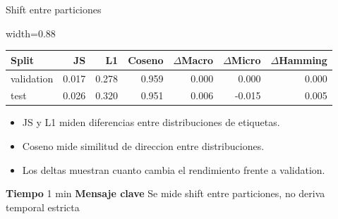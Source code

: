 \documentclass[aspectratio=169,10pt]{beamer}
\newcommand{\slidemeta}[2]{
  \vfill
  {\scriptsize\color{Muted}\textbf{Tiempo} #1 \hfill \textbf{Mensaje clave} #2}
}
\begin{document}
\begin{frame}{Shift entre particiones}
  \begin{adjustbox}{width=0.88\linewidth}
    \begin{tabular}{lrrrrrr}
      \toprule
      \textbf{Split} & \textbf{JS} & \textbf{L1} & \textbf{Coseno} & \(\Delta\)\textbf{Macro} & \(\Delta\)\textbf{Micro} & \(\Delta\)\textbf{Hamming}\\
      \midrule
      validation & 0.017 & 0.278 & 0.959 & 0.000 & 0.000 & 0.000\\
      test & 0.026 & 0.320 & 0.951 & 0.006 & -0.015 & 0.005\\
      \bottomrule
    \end{tabular}
  \end{adjustbox}
  \vspace{0.22cm}
  \small
  \begin{itemize}
    \item JS y L1 miden diferencias entre distribuciones de etiquetas.
    \item Coseno mide similitud de direccion entre distribuciones.
    \item Los deltas muestran cuanto cambia el rendimiento frente a validation.
  \end{itemize}
  \slidemeta{1 min}{Se mide shift entre particiones, no deriva temporal estricta}
\end{frame}
\end{document}
